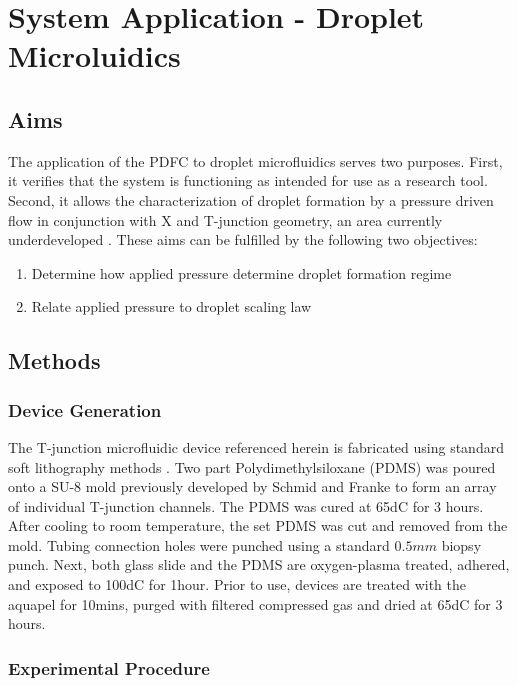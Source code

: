 \chapter{System Application - Droplet Microluidics}
\section{Aims}
The application of the PDFC to droplet microfluidics serves two purposes. First, it verifies that the system is functioning as intended for use as a research tool. Second, it allows the characterization of droplet formation by a pressure driven flow in conjunction with X and T-junction geometry, an area currently underdeveloped \cite{Christopher2008}. These aims can be fulfilled by the following two objectives:

\begin{enumerate}
\item Determine how applied pressure determine droplet formation regime
\item Relate applied pressure to droplet scaling law \cite{Zhao2011}
\end{enumerate}
\section{Methods}
\subsection{Device Generation}

The T-junction microfluidic device referenced herein is fabricated using standard soft lithography methods \cite{Stroock2002}. Two part Polydimethylsiloxane (PDMS) was poured onto a SU-8 mold previously developed by Schmid and Franke \cite{Schmid2014c} to form an array of individual T-junction channels. The PDMS was cured at 65dC for 3 hours. After cooling to room temperature, the set PDMS was cut and removed from the mold. Tubing connection holes were punched using a standard $0.5mm$ biopsy punch. Next, both glass slide and the PDMS are oxygen-plasma treated, adhered, and exposed to 100dC for 1hour. Prior to use, devices are treated with the aquapel for 10mins, purged with filtered compressed gas and dried at 65dC for 3 hours. 

\subsection{Experimental Procedure}

